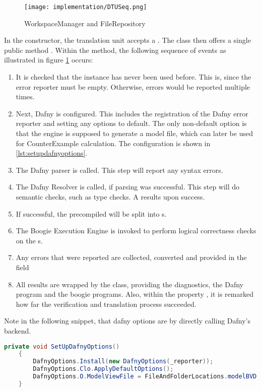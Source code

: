 \begin{figure}[H]
    \centering
    \texttt{[image: implementation/DTUSeq.png]}
    \caption{WorkspaceManager and FileRepository}
    \label{fig:DTUSeq}
\end{figure}

In the constructor, the translation unit accepts a .
The class then offers a single public method .
Within the method, the following sequence of events as illustrated in figure \ref{fig:DTUSeq} occurs:

\begin{enumerate}
    \item It is checked that the instance has never been used before.
    This is, since the error reporter must be empty.
    Otherwise, errors would be reported multiple times.
    \item Next, Dafny is configured.
    This includes the registration of the Dafny error reporter and setting any options to default.
    The only non-default option is that the engine is supposed to generate a model file, which can later be used for CounterExample calculation.
    The configuration is shown in \ref{lst:setupdafnyoptions}.
    \item The Dafny parser is called.
    This step will report any syntax errors.
    \item The Dafny Resolver is called, if parsing was successful.
    This step will do semantic checks, such as type checks.
    A  results upon success.
    \item If successful, the precompiled  will be split into s.
    \item The Boogie Execution Engine is invoked to perform logical correctness checks on the s.
    \item Any errors that were reported are collected, converted and provided in the field 
    \item All results are wrapped by the  class, providing the diagnostics, the Dafny program and the boogie programs.
    Also, within the property , it is remarked how far the verification and translation process succeeded.
\end{enumerate}


Note in the following snippet, that dafny options are by directly calling Dafny's backend.
\begin{lstlisting}[language=csharp, caption={Setting up Dafny Options}, captionpos=b, label={lst:setupdafnyoptions}]
    private void SetUpDafnyOptions()
    {
        DafnyOptions.Install(new DafnyOptions(_reporter));
        DafnyOptions.Clo.ApplyDefaultOptions();
        DafnyOptions.O.ModelViewFile = FileAndFolderLocations.modelBVD;
    }
\end{lstlisting}





